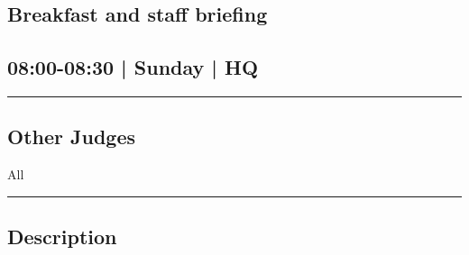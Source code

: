 \documentclass[10pt, A5]{article}
\begin{document}
		\begin{framed}
			\begin{minipage}{\textwidth}

			\setcounter{section}{91}
							\section{Breakfast and staff briefing}
						
			\subsection*{08:00-08:30 | Sunday | HQ}

			\vspace{0.25cm}
			\hrule
			\vspace{0.25cm}


			\subsection*{Other Judges}
							All

					\vspace{0.25cm}
			\hrule
			\vspace{0.25cm}

			\begin{minipage}{\textwidth}
			\subsection*{\faListAlt \: Description}
			
			\end{minipage}


	\end{minipage}
	\end{framed}

	
	
\end{document}
